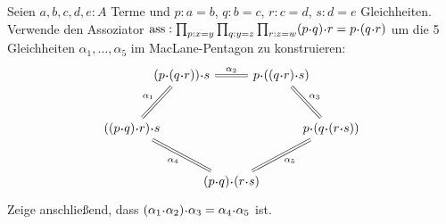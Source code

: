 \documentclass{uebung}
\begin{document}
\begin{bonus}
  Seien $a,b,c,d,e:A$ Terme und $p:a=b$, $q:b=c$, $r:c=d$, $s:d=e$ Gleichheiten.
  Verwende den Assoziator $\ass:\prod_{p:x=y}\prod_{q:y=z}\prod_{r:z=w} (p\kon q)\kon r = p \kon (q\kon r)$ um die 5 Gleichheiten $\alpha_1,\dots,\alpha_5$ im MacLane-Pentagon zu konstruieren:
  \begin{equation*}
    \begin{tikzcd}[column sep={between origins,1.4cm},row sep={between origins,1.5cm}]
      & (p \kon (q \kon r)) \kon s
      \arrow[rr,equal,"\alpha_2"]
      && p \kon ((q \kon r) \kon s)
      \arrow[dr,equal,"\alpha_3"]
      &
      \\
      ((p \kon q) \kon r) \kon s
      \arrow[ur,equal,"\alpha_1"]
      \arrow[drr,equal,"\alpha_4"']
      &&&& p \kon (q \kon (r \kon s))
      \\
      && (p \kon q) \kon (r \kon s)
      \arrow[urr,equal,"\alpha_5"']
      &&
    \end{tikzcd}
  \end{equation*}
  Zeige anschließend, dass $(\alpha_1\kon\alpha_2)\kon\alpha_3 = \alpha_4\kon\alpha_5$ ist.
\end{bonus}
\end{document}
